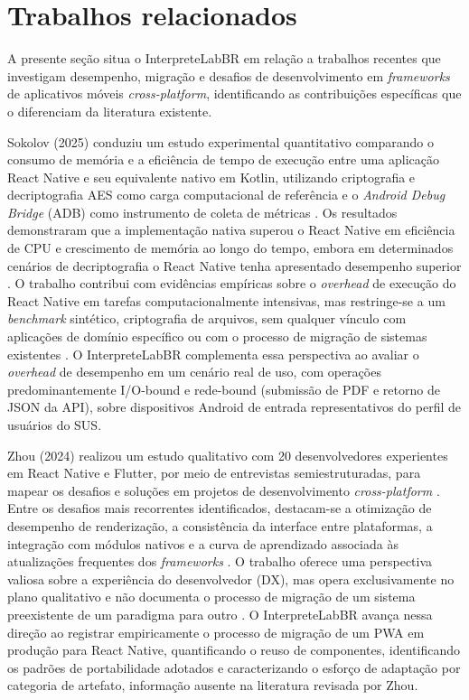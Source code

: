 \documentclass[12pt]{article}
\begin{document}
\section{Trabalhos relacionados}

A presente seção situa o InterpreteLabBR em relação a trabalhos recentes que investigam desempenho, migração e desafios de desenvolvimento em \emph{frameworks} de aplicativos móveis \emph{cross-platform}, identificando as contribuições específicas que o diferenciam da literatura existente.

Sokolov (2025) conduziu um estudo experimental quantitativo comparando o consumo de memória e a eficiência de tempo de execução entre uma aplicação React Native e seu equivalente nativo em Kotlin, utilizando criptografia e decriptografia AES como carga computacional de referência e o \emph{Android Debug Bridge} (ADB) como instrumento de coleta de métricas \cite{sokolov2025}. Os resultados demonstraram que a implementação nativa superou o React Native em eficiência de CPU e crescimento de memória ao longo do tempo, embora em determinados cenários de decriptografia o React Native tenha apresentado desempenho superior \cite{sokolov2025}. O trabalho contribui com evidências empíricas sobre o \emph{overhead} de execução do React Native em tarefas computacionalmente intensivas, mas restringe-se a um \emph{benchmark} sintético, criptografia de arquivos, sem qualquer vínculo com aplicações de domínio específico ou com o processo de migração de sistemas existentes \cite{sokolov2025}. O InterpreteLabBR complementa essa perspectiva ao avaliar o \emph{overhead} de desempenho em um cenário real de uso, com operações predominantemente I/O-bound e rede-bound (submissão de PDF e retorno de JSON da API), sobre dispositivos Android de entrada representativos do perfil de usuários do SUS.

Zhou (2024) realizou um estudo qualitativo com 20 desenvolvedores experientes em React Native e Flutter, por meio de entrevistas semiestruturadas, para mapear os desafios e soluções em projetos de desenvolvimento \emph{cross-platform} \cite{zhou2024}. Entre os desafios mais recorrentes identificados, destacam-se a otimização de desempenho de renderização, a consistência da interface entre plataformas, a integração com módulos nativos e a curva de aprendizado associada às atualizações frequentes dos \emph{frameworks} \cite{zhou2024}. O trabalho oferece uma perspectiva valiosa sobre a experiência do desenvolvedor (DX), mas opera exclusivamente no plano qualitativo e não documenta o processo de migração de um sistema preexistente de um paradigma para outro \cite{zhou2024}. O InterpreteLabBR avança nessa direção ao registrar empiricamente o processo de migração de um PWA em produção para React Native, quantificando o reuso de componentes, identificando os padrões de portabilidade adotados e caracterizando o esforço de adaptação por categoria de artefato, informação ausente na literatura revisada por Zhou.
\end{document}
